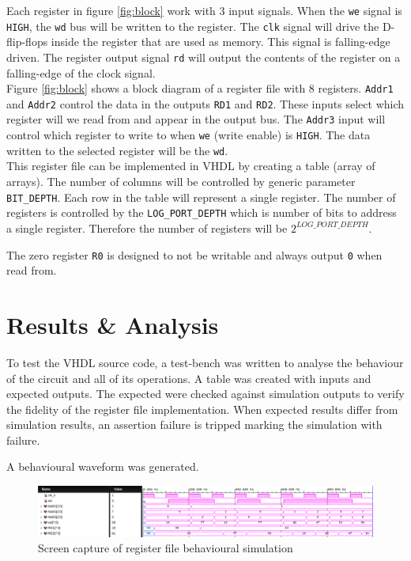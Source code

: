 \documentclass[CMPE]{../KGCOEReport}
\def\code#1{\texttt{#1}}
\begin{document}
    Each register in figure \ref{fig:block} work with 3 input signals. When
    the \code {we} signal is \code{HIGH}, the \code{wd} bus will be written to
    the register. The \code {clk} signal will drive the D-flip-flops inside the
    register that are used as memory. This signal is falling-edge driven.
    The register output signal \code{rd} will output the contents of the register
    on a falling-edge of the clock signal.
    \\

    Figure \ref{fig:block} shows a block diagram of a register file with 8 registers. \code{Addr1} and \code{Addr2} control the data in the outputs
    \code{RD1} and \code{RD2}.
    These inputs select which register will we read from and appear in the output
    bus.
    The \code{Addr3} input will control which register to write to when \code{we}
    (write enable) is \code{HIGH}.
    The data written to the selected register will be the \code{wd}.
    \\

    This register file can be implemented in VHDL by creating a table
    (array of arrays).
    The number of columns will be controlled by generic parameter
    \code{BIT\_DEPTH}.
    Each row in the table will represent a single register.
    The number of registers is controlled by the \code{LOG\_PORT\_DEPTH} which is
    number of bits to address a single register.
    Therefore the number of registers will be $2^{LOG\_PORT\_DEPTH}$.

    The zero register \code{R0} is designed to not be writable and always output
    \code{0} when read from.

    \section*{Results \& Analysis}
    To test the VHDL source code, a test-bench was written to analyse the
    behaviour of the circuit and all of its operations. A table was created
    with inputs and expected outputs. The expected were checked against simulation
    outputs to verify the fidelity of the register file implementation.
    When expected results differ from simulation results, an assertion failure
    is tripped marking the simulation with failure.

    A behavioural waveform was generated.

    \begin{figure}[h!]
        \centering
        \includegraphics[width=\textwidth]{img/behaviour}
        \caption{Screen capture of register file behavioural simulation}
        \label{fig:behave}
    \end{figure}
\end{document}
